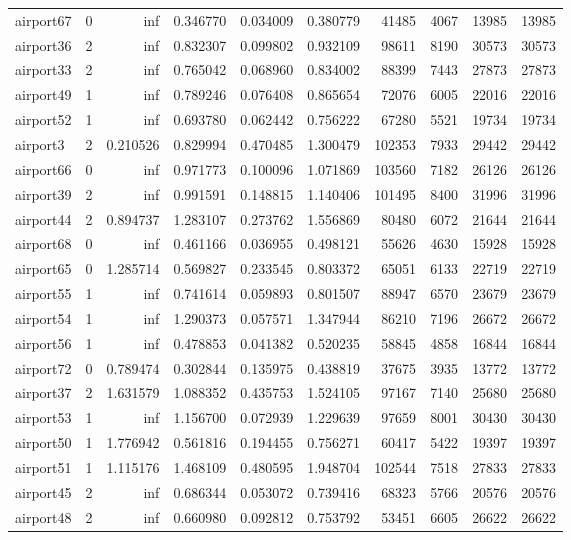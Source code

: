\begin{longtable}{|l|r|r|r|r|r|r|r|r|r|}
airport67 & 0 & inf & 0.346770 & 0.034009 & 0.380779 & 41485 & 4067 & 13985 & 13985 \\
airport36 & 2 & inf & 0.832307 & 0.099802 & 0.932109 & 98611 & 8190 & 30573 & 30573 \\
airport33 & 2 & inf & 0.765042 & 0.068960 & 0.834002 & 88399 & 7443 & 27873 & 27873 \\
airport49 & 1 & inf & 0.789246 & 0.076408 & 0.865654 & 72076 & 6005 & 22016 & 22016 \\
airport52 & 1 & inf & 0.693780 & 0.062442 & 0.756222 & 67280 & 5521 & 19734 & 19734 \\
airport3 & 2 & 0.210526 & 0.829994 & 0.470485 & 1.300479 & 102353 & 7933 & 29442 & 29442 \\
airport66 & 0 & inf & 0.971773 & 0.100096 & 1.071869 & 103560 & 7182 & 26126 & 26126 \\
airport39 & 2 & inf & 0.991591 & 0.148815 & 1.140406 & 101495 & 8400 & 31996 & 31996 \\
airport44 & 2 & 0.894737 & 1.283107 & 0.273762 & 1.556869 & 80480 & 6072 & 21644 & 21644 \\
airport68 & 0 & inf & 0.461166 & 0.036955 & 0.498121 & 55626 & 4630 & 15928 & 15928 \\
airport65 & 0 & 1.285714 & 0.569827 & 0.233545 & 0.803372 & 65051 & 6133 & 22719 & 22719 \\
airport55 & 1 & inf & 0.741614 & 0.059893 & 0.801507 & 88947 & 6570 & 23679 & 23679 \\
airport54 & 1 & inf & 1.290373 & 0.057571 & 1.347944 & 86210 & 7196 & 26672 & 26672 \\
airport56 & 1 & inf & 0.478853 & 0.041382 & 0.520235 & 58845 & 4858 & 16844 & 16844 \\
airport72 & 0 & 0.789474 & 0.302844 & 0.135975 & 0.438819 & 37675 & 3935 & 13772 & 13772 \\
airport37 & 2 & 1.631579 & 1.088352 & 0.435753 & 1.524105 & 97167 & 7140 & 25680 & 25680 \\
airport53 & 1 & inf & 1.156700 & 0.072939 & 1.229639 & 97659 & 8001 & 30430 & 30430 \\
airport50 & 1 & 1.776942 & 0.561816 & 0.194455 & 0.756271 & 60417 & 5422 & 19397 & 19397 \\
airport51 & 1 & 1.115176 & 1.468109 & 0.480595 & 1.948704 & 102544 & 7518 & 27833 & 27833 \\
airport45 & 2 & inf & 0.686344 & 0.053072 & 0.739416 & 68323 & 5766 & 20576 & 20576 \\
airport48 & 2 & inf & 0.660980 & 0.092812 & 0.753792 & 53451 & 6605 & 26622 & 26622 \\

\end{longtable}
